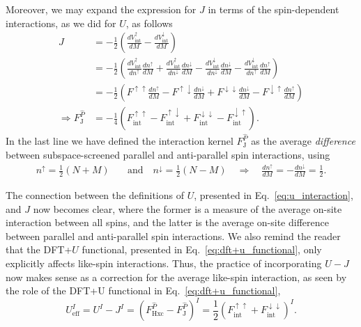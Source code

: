 Moreover, 
we may expand the expression for $J$ 
in terms of the spin-dependent interactions, 
as we did for $U$, as follows
%
\begin{align}
J
&=-\frac{1}{2}\left(\frac{dV_\textrm{int}^\uparrow}{dM}
-\frac{dV_\textrm{int}^\downarrow}{dM}\right) \nonumber\\[0.75em]
&=-\frac{1}{2}\left(\frac{d V_\textrm{int}^\uparrow}{d n^\uparrow}\frac{dn^\uparrow}{dM} 
+\frac{d V_\textrm{int}^\uparrow}{d n^\downarrow}\frac{dn^\downarrow}{dM} 
-\frac{d V_\textrm{int}^\downarrow}{d n^\downarrow}\frac{dn^\downarrow}{dM} 
-\frac{d V_\textrm{int}^\downarrow}{d n^\uparrow}\frac{dn^\uparrow}{dM} \right) \nonumber\\[0.75em]
&=-\frac{1}{2}\left(F^{\uparrow\uparrow}\frac{dn^\uparrow}{dM} 
-F^{\uparrow\downarrow}\frac{dn^\downarrow}{dM} 
+F^{\downarrow\downarrow}\frac{dn^\downarrow}{dM} 
-F^{\downarrow\uparrow}\frac{dn^\uparrow}{dM} \right)\nonumber \\[0.75em]
\Rightarrow F^{\hat{P}}_\textrm{J}&=-\frac{1}{4}\left(F_\textrm{int}^{\uparrow\uparrow}-F_\textrm{int}^{\uparrow\downarrow}
+F_\textrm{int}^{\downarrow\downarrow}-F_\textrm{int}^{\downarrow\uparrow}\right).
\label{eq:j_interaction}
\end{align}
%
In the last line we have defined the 
interaction kernel $F^{\hat{P}}_\textrm{J}$ 
as the average {\it difference} between subspace-screened 
parallel and anti-parallel spin interactions, 
using 
%
\begin{align}
n^\uparrow=\frac{1}{2}(N+M)
\quad&\mbox{and}\quad
n^\downarrow=\frac{1}{2}(N-M)
\quad \Rightarrow\quad
\frac{dn^\uparrow}{dM}=-\frac{dn^\downarrow}{dM}=\frac{1}{2}.
\end{align}


The connection between the definitions 
of $U$,  presented in Eq.~\eqref{eq:u_interaction}, 
and $J$ now becomes clear, 
where the former is a measure of 
the average on-site interaction between all spins, 
and the latter is the average on-site difference  
between parallel and anti-parallel spin interactions.
%
{
We also remind the reader 
that the DFT+$U$ functional, 
presented in Eq.~\eqref{eq:dft+u_functional}, 
only explicitly affects like-spin interactions.}
%
Thus, the practice of incorporating 
$U-J$ now makes sense 
as a correction for the average like-spin interaction, 
as seen by the role of the DFT+U functional 
in Eq.~\eqref{eq:dft+u_functional}, 
%
\begin{equation}
U^I_\textrm{eff}=U^I-J^I
=\left(F^{\hat{P}}_\textrm{Hxc}-F^{\hat{P}}_\textrm{J}\right)^I
=\frac{1}{2}\left(F^{\uparrow\uparrow}_\textrm{int}+F^{\downarrow\downarrow}_\textrm{int}\right)^I.
\label{eq:u-j_interaction}
\end{equation}

